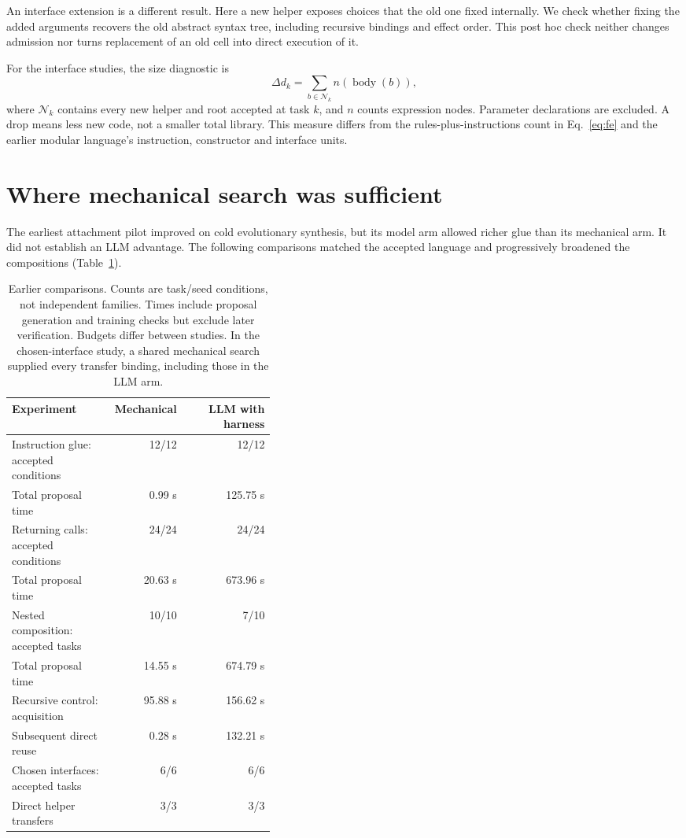 An interface extension is a different result. Here a new helper exposes choices
that the old one fixed internally. We check whether fixing the added arguments
recovers the old abstract syntax tree, including recursive bindings and effect
order. This post hoc check neither changes admission nor turns replacement of
an old cell into direct execution of it.

For the interface studies, the size diagnostic is
\begin{equation}
 \Delta d_k=\sum_{b\in\mathcal N_k} n(\operatorname{body}(b)),
 \label{eq:growth-size}
\end{equation}
where $\mathcal N_k$ contains every new helper and root accepted at task $k$,
and $n$ counts expression nodes. Parameter declarations are excluded. A drop
means less new code, not a smaller total library. This measure differs from
the rules-plus-instructions count in Eq.~\eqref{eq:fe} and the earlier modular
language's instruction, constructor and interface units.

\section{Where mechanical search was sufficient}
\label{sec:growth-ladder}

The earliest attachment pilot improved on cold evolutionary synthesis, but its
model arm allowed richer glue than its mechanical arm. It did not establish
an LLM advantage. The following comparisons matched the accepted language
and progressively broadened the compositions (Table~\ref{tab:growth-ladder}).

\begin{table}[htbp]
\centering
\small
\begin{tabular}{p{0.39\linewidth}rr}
\toprule
Experiment & Mechanical & LLM with harness \\
\midrule
Instruction glue: accepted conditions & 12/12 & 12/12 \\
\quad Total proposal time & 0.99 s & 125.75 s \\
Returning calls: accepted conditions & 24/24 & 24/24 \\
\quad Total proposal time & 20.63 s & 673.96 s \\
Nested composition: accepted tasks & 10/10 & 7/10 \\
\quad Total proposal time & 14.55 s & 674.79 s \\
Recursive control: acquisition & 95.88 s & 156.62 s \\
\quad Subsequent direct reuse & 0.28 s & 132.21 s \\
Chosen interfaces: accepted tasks & 6/6 & 6/6 \\
\quad Direct helper transfers & 3/3 & 3/3 \\
\bottomrule
\end{tabular}
\caption{Earlier comparisons. Counts are task/seed conditions, not independent
families. Times include proposal generation and training checks but exclude
later verification. Budgets differ between studies. In the chosen-interface
study, a shared mechanical search supplied every transfer binding, including
those in the LLM arm.}
\label{tab:growth-ladder}
\end{table}

